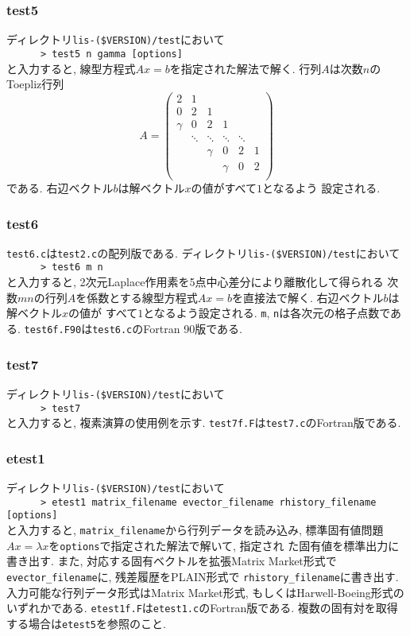 \documentclass[a4paper]{jarticle}
\begin{document}
{{\subsubsection{test5}
ディレクトリ{\tt lis-(\$VERSION)/test}において\\
 \verb+      > test5 n gamma [options]+\\
と入力すると, 
線型方程式$Ax=b$を指定された解法で解く. 
行列$A$は次数$n$のToepliz行列
\[
A = \left(
\begin{array}{cccccc}
2 & 1 &   &  &  & \\
0 & 2 & 1 &  &  & \\
\gamma & 0& 2 & 1 &  & \\
 & \ddots & \ddots & \ddots & \ddots & \\
 &  &   \gamma &0 &       2   & 1 \\
 &  &  &   \gamma & 0& 2 \\
\end{array}
\right)
\]
である. 右辺ベクトル$b$は解ベクトル$x$の値がすべて$1$となるよう
設定される. 

\subsubsection{test6}
{\tt test6.c}は{\tt test2.c}の配列版である. 
ディレクトリ{\tt lis-(\$VERSION)/test}において\\
 \verb+      > test6 m n+\\
と入力すると, 2次元Laplace作用素を5点中心差分により離散化して得られる
次数$mn$の行列$A$を係数とする線型方程式$Ax=b$を直接法で解く.
右辺ベクトル$b$は解ベクトル$x$の値が
すべて$1$となるよう設定される. {\tt m}, {\tt n}は各次元の格子点数である. 
{\tt test6f.F90}は{\tt test6.c}のFortran 90版である.

\subsubsection{test7}
ディレクトリ{\tt lis-(\$VERSION)/test}において\\
 \verb+      > test7+\\
と入力すると, 複素演算の使用例を示す.
{\tt test7f.F}は{\tt test7.c}のFortran版である.

\subsubsection{etest1}
ディレクトリ{\tt lis-(\$VERSION)/test}において\\
 \verb+      > etest1 matrix_filename evector_filename rhistory_filename [options]+\\
と入力すると, {\tt matrix\_filename}から行列データを読み込み, 
標準固有値問題$Ax=\lambda x$を{\tt options}で指定された解法で解いて, 指定され
た固有値を標準出力に書き出す. また, 対応する固有ベクトルを拡張Matrix
 Market形式で{\tt evector\_filename}に, 残差履歴をPLAIN形式で
{\tt rhistory\_filename}に書き出す. 
入力可能な行列データ形式はMatrix Market形式, もしくはHarwell-Boeing形式の
いずれかである. 
{\tt etest1f.F}は{\tt etest1.c}のFortran版である. 
複数の固有対を取得する場合は{\tt etest5}を参照のこと.

}}
\end{document}
